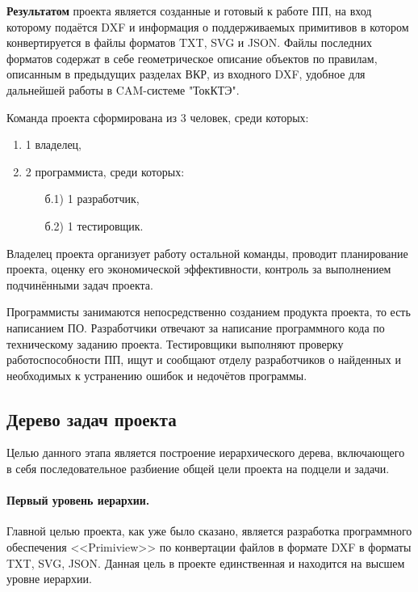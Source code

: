 \textbf{Результатом} проекта является созданные и готовый к работе ПП, на вход которому подаётся DXF и информация о поддерживаемых примитивов в котором конвертируется в файлы форматов TXT, SVG и JSON. Файлы последних форматов содержат в себе геометрическое описание объектов по правилам, описанным в предыдущих разделах ВКР, из входного DXF, удобное для дальнейшей работы в CAM-системе "ТокКТЭ".

Команда проекта сформирована из 3 человек, среди которых:
\begin{enumerate}
	\item 1 владелец,
	\item 2 программиста, среди которых:
	\begin{enumerate}
		\item[б.1)] 1 разработчик,
		\item[б.2)] 1 тестировщик.
	\end{enumerate}
\end{enumerate}

Владелец проекта организует работу остальной команды, проводит планирование проекта, оценку его экономической эффективности, контроль за выполнением подчинёнными задач проекта.

Программисты занимаются непосредственно созданием продукта проекта, то есть написанием ПО. Разработчики отвечают за написание программного кода по техническому заданию проекта. Тестировщики выполняют проверку работоспособности ПП, ищут и сообщают отделу разработчиков о найденных и необходимых к устранению ошибок и недочётов программы.




\subsection{Дерево задач проекта}

Целью данного этапа является построение иерархического дерева, включающего в себя последовательное разбиение общей цели проекта на подцели и задачи.

\paragraph{Первый уровень иерархии.}

Главной целью проекта, как уже было сказано, является разработка программного обеспечения <<Primiview>> по конвертации файлов в формате DXF в форматы TXT, SVG, JSON. Данная цель в проекте единственная и находится на высшем уровне иерархии.

